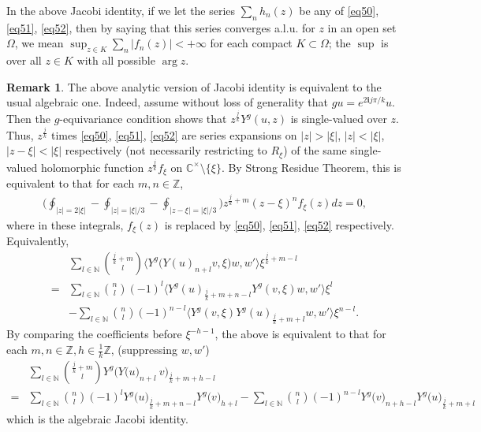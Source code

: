 \documentclass[12pt,a4paper,notitlepage]{article}
\theoremstyle{definition}
\newtheorem{rem}[df]{Remark}
\theoremstyle{plain}
\newcommand{\im}{\mathbf{i}}
\newcommand{\Cbb}{\mathbb C}
\newcommand{\Nbb}{\mathbb N}
\newcommand{\Zbb}{\mathbb Z}
\numberwithin{equation}{section}
\begin{document}
In the above Jacobi identity, if we let the series $\sum_n h_n(z)$ be any of \eqref{eq50}, \eqref{eq51}, \eqref{eq52}, then by saying that this series converges a.l.u. for $z$ in an open set $\Omega$, we mean $\sup_{z\in K}\sum_n|f_n(z)|<+\infty$ for each compact $K\subset\Omega$; the $\sup$ is over all $z\in K$ with all possible $\arg z$.


\begin{rem}
The above analytic version of Jacobi identity is equivalent to the usual algebraic one. Indeed, assume without loss of generality that $gu=e^{2\im j\pi/k}u$. Then the $g$-equivariance condition shows that $z^{\frac jk}Y^g(u,z)$ is single-valued over $z$. Thus,  $z^{\frac jk}$ times \eqref{eq50}, \eqref{eq51}, \eqref{eq52} are series expansions on $|z|>|\xi|$, $|z|<|\xi|$, $|z-\xi|<|\xi|$ respectively (not necessarily restricting to $R_\xi$) of the same single-valued holomorphic function $z^{\frac jk}f_\xi$ on $\Cbb^\times\setminus\{\xi\}$. By Strong Residue Theorem, this is equivalent to that for each $m,n\in\Zbb$,
\begin{align*}
\Big(\oint_{|z|=2|\xi|}-\oint_{|z|=|\xi|/3}-\oint_{|z-\xi|=|\xi|/3}\Big)z^{\frac jk+m}(z-\xi)^nf_\xi(z)dz=0,
\end{align*}
where in these integrals, $f_\xi(z)$ is replaced by \eqref{eq50}, \eqref{eq51}, \eqref{eq52} respectively. Equivalently,
\begin{align}
&\sum_{l\in\Nbb}{\frac jk+m\choose l}\big\langle Y^g\big(Y(u)_{n+l}v,\xi\big)w,w'\big\rangle\xi^{\frac jk+m-l}\nonumber	\\
=&\sum_{l\in\Nbb}{n\choose l}(-1)^l\big\langle Y^g(u)_{\frac jk+m+n-l}Y^g(v,\xi)w,w'\big\rangle\xi^l \nonumber\\
&-\sum_{l\in\Nbb}{n\choose l}(-1)^{n-l}\big\langle Y^g(v,\xi)Y^g(u)_{\frac jk+m+l}w,w'\big\rangle\xi^{n-l}.
\end{align}
By comparing the coefficients before $\xi^{-h-1}$, the above is equivalent to that for each $m,n\in\Zbb,h\in\frac 1k\Zbb$, (suppressing $w,w'$)
\begin{align}
&\sum_{l\in\Nbb}{\frac jk+m\choose l} Y^g\big(Y\big(u\big)_{n+l}~v\big)_{\frac jk+m+h-l}  \nonumber\\
=&\sum_{l\in\Nbb}{n\choose l}(-1)^l Y^g\big(u\big)_{\frac jk+m+n-l}Y^g\big(v\big)_{h+l}-\sum_{l\in\Nbb}{n\choose l}(-1)^{n-l}Y^g\big(v\big)_{n+h-l}Y^g\big(u\big)_{\frac jk+m+l}	
\end{align}
which is the algebraic Jacobi identity.
\end{rem}
\end{document}
